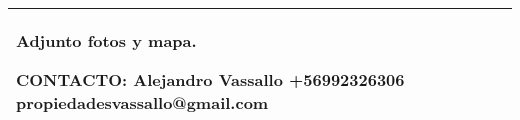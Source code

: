 \begin{table}[H]
\begin{tabular}{|l|m{35em}|}
Adjunto fotos y mapa.

CONTACTO: Alejandro Vassallo  +56992326306 propiedadesvassallo@gmail.com \\
\hline
\end{tabular}
\end{table}
